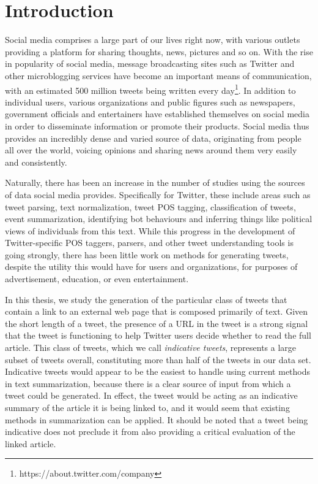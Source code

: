 \chapter{Introduction}
\label{chap:intro}

Social media comprises a large part of our lives right now, with various outlets providing a platform for sharing thoughts, news, pictures and so on. With the rise in popularity of social media, message broadcasting sites such as Twitter and other microblogging services have become an important means of communication, with an estimated 500 million tweets being written every day\footnote{https://about.twitter.com/company}. In addition to individual users, various organizations and public figures such as newspapers, government officials and entertainers have established themselves on social media in order to disseminate information or promote their products. Social media thus provides an incredibly dense and varied source of data, originating from people all over the world, voicing opinions and sharing news around them very easily and consistently.

Naturally, there has been an increase in the number of studies using the sources of data social media provides. Specifically for Twitter, these include areas such as tweet parsing, text normalization, tweet POS tagging, classification of tweets, event summarization, identifying bot behaviours and inferring things like political views of individuals from this text. While this progress in the development of Twitter-specific POS taggers, parsers, and other tweet understanding tools \cite{owoputi-etal-2013,kong-etal-2014} is going strongly, there has been little work on methods for generating tweets, despite the utility this would have for users and organizations, for purposes of advertisement, education, or even entertainment. 

In this thesis, we study the generation of the particular class of tweets that contain a link to an external web page that is composed primarily of text. Given the short length of a tweet, the presence of a URL in the tweet is a strong signal that the tweet is functioning to help Twitter users decide whether to read the full article. This class of tweets, which we call \emph{indicative tweets}, represents a large subset of tweets overall, constituting more than half of the tweets in our data set. Indicative tweets would appear to be the easiest to handle using current methods in text summarization, because there is a clear source of input from which a tweet could be generated. In effect, the tweet would be acting as an indicative summary of the article it is being linked to, and it would seem that existing methods in summarization can be applied. It should be noted that a tweet being indicative does not preclude it from also providing a critical evaluation of the linked article.

